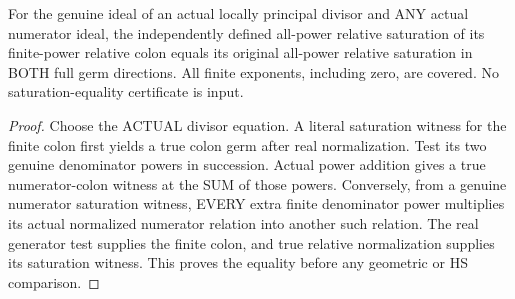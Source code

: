 \begin{theorem}
\label{hir:sharp-actual-relative-saturation-finite-colon-invariance}
\leanok
For the genuine ideal of an actual locally principal divisor and ANY actual
numerator ideal, the independently defined all-power relative saturation
of its finite-power relative colon equals its original all-power relative
saturation in BOTH full germ directions. All finite exponents, including
zero, are covered. No saturation-equality certificate is input.
\end{theorem}
\begin{proof}
Choose the ACTUAL divisor equation. A literal saturation witness for the
finite colon first yields a true colon germ after real normalization.
Test its two genuine denominator powers in succession. Actual power
addition gives a true numerator-colon witness at the SUM of those powers.
Conversely, from a genuine numerator saturation witness, EVERY extra
finite denominator power multiplies its actual normalized numerator
relation into another such relation. The real generator test supplies the
finite colon, and true relative normalization supplies its saturation
witness. This proves the equality before any geometric or HS comparison.
\end{proof}

